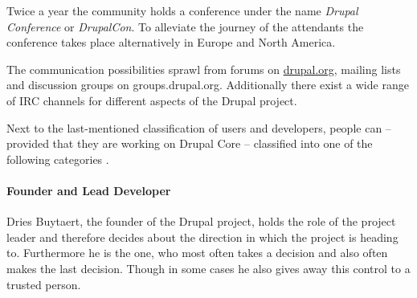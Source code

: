 Twice a year the community holds a conference under the name \emph{Drupal
Conference} or \emph{DrupalCon}. To alleviate the journey of the attendants the
conference takes place alternatively in Europe and North America.

The communication possibilities sprawl from forums on \url{drupal.org}, mailing
lists and discussion groups on groups.drupal.org. Additionally there exist a
wide range of \ac{IRC} channels for different aspects of the Drupal project.

Next to the last-mentioned classification of users and developers, people can
-- provided that they are working on Drupal Core -- classified into one of the
following categories \cite{DrupalCoreDevelopers}.

\paragraph{Founder and Lead Developer}

Dries Buytaert, the founder of the Drupal project, holds the role of the
project leader and therefore decides about the direction in which the project
is heading to. Furthermore he is the one, who most often takes a decision and
also often makes the last decision. Though in some cases he also gives away
this control to a trusted person.

